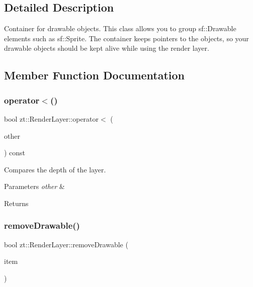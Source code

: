 \subsection{Detailed Description}
Container for drawable objects. This class allows you to group sf\+::\+Drawable elements such as sf\+::\+Sprite. The container keeps pointers to the objects, so your drawable objects should be kept alive while using the render layer. 

\subsection{Member Function Documentation}
\mbox{\label{classzt_1_1_render_layer_a7eb4504147aee10b610602c8363311ca}} 
\subsubsection{\texorpdfstring{operator$<$()}{operator<()}}
{\footnotesize\ttfamily bool zt\+::\+Render\+Layer\+::operator$<$ (\begin{DoxyParamCaption}\item[{\hyperlink{classzt_1_1_render_layer}{zt\+::\+Render\+Layer} \&}]{other }\end{DoxyParamCaption}) const}

Compares the depth of the layer. 
\begin{DoxyParams}{Parameters}
{\em other} & \\
\hline
\end{DoxyParams}
\begin{DoxyReturn}{Returns}

\end{DoxyReturn}
\mbox{\label{classzt_1_1_render_layer_a7273e706c4f0a727cc363a02b762ebe3}} 
\subsubsection{\texorpdfstring{remove\+Drawable()}{removeDrawable()}}
{\footnotesize\ttfamily bool zt\+::\+Render\+Layer\+::remove\+Drawable (\begin{DoxyParamCaption}\item[{sf\+::\+Drawable \&}]{item }\end{DoxyParamCaption})}



